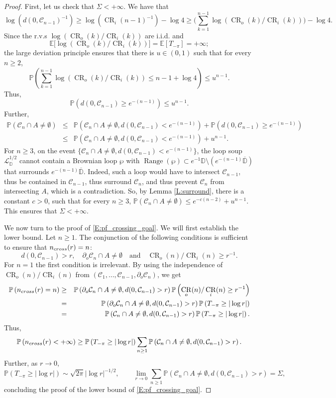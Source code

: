 \documentclass[11pt]{article}
\theoremstyle{remark}
\newcommand{\D}{\mathbb{D}}
\newcommand{\Cc}{\mathcal{C}}
\newcommand{\Lc}{\mathcal{L}}
\newcommand{\expect}{\mathbb{E}}
\newcommand{\Prob}[1]{\mathbb{P} \left( #1 \right) }
\DeclareMathOperator{\CR}{CR}
\DeclareMathOperator{\Range}{Range}
\numberwithin{equation}{section}
\begin{document}
\begin{proof}
First, let us check that $\Sigma<+\infty$.
We have that
\[
\log(d(0,\Cc_{n-1})^{-1})
\geq
\log (\CR_{i}(n-1)^{-1}) - \log 4
\geq
\Big(\sum_{k=1}^{n-1}
\log (\CR_{o}(k)/\CR_{i}(k))\Big) - \log 4.
\]
Since the r.v.s $\log (\CR_{o}(k)/\CR_{i}(k))$ are i.i.d.
and
\[
\expect\Big[\log (\CR_{o}(k)/\CR_{i}(k))\Big]
=
\expect [T_{-\pi}]  = +\infty;
\]
the large deviation principle ensures that there is $u\in (0,1)$ such that
for every $n\geq 2$, 
\[
\Prob{
\sum_{k=1}^{n-1}
\log (\CR_{o}(k)/\CR_{i}(k))
\leq n-1 + \log 4}
\leq u^{n-1}.
\]
Thus,
\[
\Prob{d(0,\Cc_{n-1})\geq e^{-(n-1)}}\leq u^{n-1}.
\]
Further,
\begin{eqnarray*}
\Prob{\Cc_{n}\cap A\neq\emptyset}
&\leq &
\Prob{\Cc_{n}\cap A\neq\emptyset, d(0,\Cc_{n-1})< e^{-(n-1)}}
+
\Prob{d(0,\Cc_{n-1})\geq e^{-(n-1)}}
\\
&\leq & 
\Prob{\Cc_{n}\cap A\neq\emptyset, d(0,\Cc_{n-1})< e^{-(n-1)}}
+
u^{n-1}.
\end{eqnarray*}
For $n\geq 3$, on the event 
$\{\Cc_{n}\cap A\neq\emptyset, d(0,\Cc_{n-1})< e^{-(n-1)}\}$,
the loop soup $\Lc^{1/2}_{\D}$ cannot contain a Brownian loop $\wp$
with $\Range(\wp)\subset e^{-1}\D\setminus(e^{-(n-1)}\overline{\D})$
that surrounds $e^{-(n-1)}\overline{\D}$.
Indeed, such a loop would have to intersect $\Cc_{n-1}$,
thus be contained in $\Cc_{n-1}$,
thus surround $\Cc_{n}$, and thus prevent $\Cc_{n}$ from intersecting $A$,
which is a contradiction.
So, by Lemma \ref{L:surround}, there is a constant $c>0$,
such that for every $n\geq 3$,
$
\Prob{\Cc_{n}\cap A\neq\emptyset}
\leq e^{-c(n-2)} + u^{n-1}.
$
This ensures that $\Sigma<+\infty$.

We now turn to the proof of \eqref{E:pf_crossing_goal}. We will first establish the lower bound. 
Let $n\geq 1$. 
The conjunction of the following conditions is sufficient to ensure that 
$n_{\rm cross}(r) = n$:
\[
d(0,\Cc_{n-1})>r, \quad \partial_{o}\Cc_{n}\cap A\neq \emptyset \quad \text{and} \quad \CR_{o}(n)/\CR_{i}(n)\geq r^{-1}.
\]
For $n=1$ the first condition is irrelevant.
By using the independence of $\CR_{o}(n)/\CR_{i}(n)$ from
$(\Cc_{1},\dots,\Cc_{n-1},\partial_{o}\Cc_{n})$,
we get
\begin{eqnarray*}
\Prob{n_{\rm cross}(r) = n}
&\geq &\Prob{\partial_{o}\Cc_{n}\cap A\neq \emptyset, d(0,\Cc_{n-1})>r}
\Prob{\CR_{o}(n)/\CR_{i}(n)\geq r^{-1}}
\\& = &
\Prob{\partial_{o}\Cc_{n}\cap A\neq \emptyset, d(0,\Cc_{n-1})>r}
\Prob{T_{-\pi}\geq\vert\log r\vert}
\\& = &
\Prob{\Cc_{n}\cap A\neq \emptyset, d(0,\Cc_{n-1})>r}
\Prob{T_{-\pi}\geq\vert\log r\vert}.
\end{eqnarray*}
Thus,
\[
\Prob{n_{\rm cross}(r) <+\infty}
\geq \Prob{T_{-\pi}\geq\vert\log r\vert}
\sum_{n\geq 1}\Prob{\Cc_{n}\cap A\neq \emptyset, d(0,\Cc_{n-1})>r}.
\]
Further, as $r\to 0$,
\[
\Prob{T_{-\pi}\geq\vert\log r\vert}\sim
\sqrt{2\pi} \vert\log r\vert^{-1/2},
\qquad
\lim_{r\to 0}
\sum_{n\geq 1}\Prob{\Cc_{n}\cap A\neq \emptyset, d(0,\Cc_{n-1})>r}
=\Sigma,
\]
concluding the proof of the lower bound of \eqref{E:pf_crossing_goal}.


\end{proof}
\end{document}
